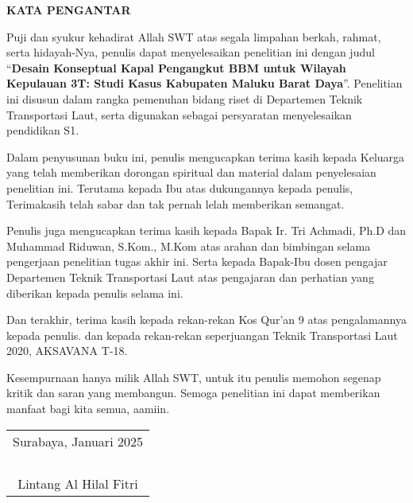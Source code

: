\begin{center}
  \Large
  \textbf{KATA PENGANTAR}
\end{center}

\vspace{2ex}

Puji dan syukur kehadirat Allah SWT atas segala limpahan berkah, rahmat, serta hidayah-Nya, penulis  dapat menyelesaikan penelitian ini dengan judul
``\textbf{Desain Konseptual Kapal Pengangkut BBM untuk Wilayah Kepulauan 3T: Studi Kasus Kabupaten Maluku Barat Daya}''.
Penelitian ini disusun dalam rangka pemenuhan bidang riset di Departemen Teknik Transportasi Laut,
  serta digunakan sebagai persyaratan menyelesaikan pendidikan S1.

Dalam penyusunan buku ini,
  penulis mengucapkan terima kasih kepada Keluarga yang telah memberikan dorongan spiritual dan material dalam penyelesaian penelitian ini.
Terutama kepada Ibu atas dukungannya kepada penulis, Terimakasih telah sabar dan tak pernah lelah memberikan semangat.

Penulis juga mengucapkan terima kasih kepada Bapak Ir. Tri Achmadi, Ph.D 
  dan Muhammad Riduwan, S.Kom., M.Kom atas arahan dan bimbingan selama pengerjaan penelitian tugas akhir ini.
Serta kepada Bapak-Ibu dosen pengajar Departemen Teknik Transportasi Laut atas pengajaran dan perhatian yang diberikan kepada penulis selama ini.

Dan terakhir,
  terima kasih kepada rekan-rekan Kos Qur'an 9 atas pengalamannya kepada penulis.
dan kepada rekan-rekan seperjuangan Teknik Transportasi Laut 2020, AKSAVANA T-18.

Kesempurnaan hanya milik Allah SWT, untuk itu penulis memohon segenap kritik dan saran yang  membangun.
Semoga penelitian ini dapat memberikan manfaat bagi kita semua, aamiin.

\vspace{4ex}

\begin{flushright}
  \begin{tabular}[b]{c}
    Surabaya, Januari 2025\\
    \\
    \\
    \\
    \\
    Lintang Al Hilal Fitri
  \end{tabular}
\end{flushright}

